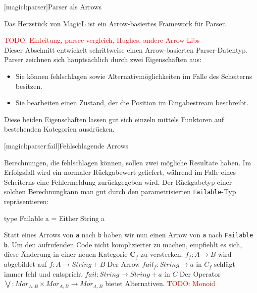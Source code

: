 \documentclass[a4paper, bibgerm]{article}
\newcommand\icode[1]{\lstinline?#1?}
\newcommand{\todo}[1]{
  \textcolor{red}{TODO: #1}
}
\newcommand\lsubsection{}
\newcommand\lsubsubsection{}
\begin{document}
\lsubsection[magicl:parser]{Parser als Arrows}

Das Herzstück von MagicL ist ein Arrow-basiertes Framework für Parser.

\todo{Einleitung, parsec-vergleich, Hughes, andere Arrow-Libs}\\
Dieser Abschnitt entwickelt schrittweise einen Arrow-basierten
Parser-Datentyp. Parser zeichnen sich hauptsächlich durch zwei Eigenschaften aus:
\begin{itemize}
\item Sie können fehlschlagen sowie Alternativmöglichkeiten im Falle des
  Scheiterns besitzen.
\item Sie bearbeiten einen Zustand, der die Position im Eingabestream
  beschreibt.
\end{itemize}
Diese beiden Eigenschaften lassen gut sich einzeln mittels Funktoren auf
bestehenden Kategorien ausdrücken.

\lsubsubsection[magicl:parser:fail]{Fehlschlagende Arrows}

Berechnungen, die fehlschlagen können, sollen zwei mögliche Resultate
haben. Im Erfolgsfall wird ein normaler Rückgabewert geliefert, während
im Falle eines Scheiterns eine Fehlermeldung zurückgegeben wird. Der
Rückgabetyp einer solchen Berechnungkann man gut durch den parametrisierten \icode{Failable}-Typ
repräsentieren:

\begin{code}
type Failable a = Either String a
\end{code}

Statt eines Arrows von \icode{a} nach \icode{b} haben wir nun einen
Arrow von \icode{a} nach \icode{Failable b}. Um den aufrufenden Code
nicht komplizierter zu machen, empfiehlt es sich, diese Änderung in
einer neuen Kategorie $\mathbf{C}_f$ zu verstecken. $f_{f} : A
\rightarrow B$ wird abgebildet auf $f : A \rightarrow String + B$
Der Arrow $fail_{f} : String \rightarrow a$ in $C_{f}$ schlägt immer
fehl und entspricht $fail : String \rightarrow String + a$ in $C$
Der Operator $\bigvee : Mor_{A,B} \times Mor_{A,B} \rightarrow
Mor_{A,B} $ bietet Alternativen. \todo{Monoid}
\end{document}
